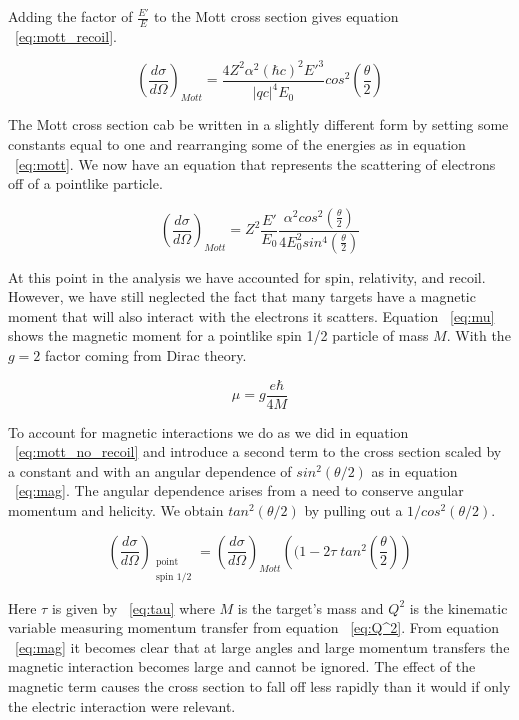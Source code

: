 \noindent Adding the factor of $\frac{E'}{E}$ to the Mott cross section gives equation ~\ref{eq:mott_recoil}.

\begin{equation} \label{eq:mott_recoil}
\left(\frac{d\sigma}{d\Omega}\right)_{Mott} = \frac{4Z^2\alpha^2\left(\hbar c\right)^2E'^3}{|qc|^4 E_0} cos^2 \left( \frac{\theta}{2} \right)
\end{equation}

\noindent The Mott cross section cab be written in a slightly different form by setting some constants equal to one and rearranging some of the energies as in equation ~\ref{eq:mott}. We now have an equation that represents the scattering of electrons off of a pointlike particle.

\begin{equation} \label{eq:mott}
\left(\frac{d\sigma}{d\Omega}\right)_{Mott} = Z^2 \frac{E'}{E_0} \frac{\alpha^2 cos^2\left( \frac{\theta}{2} \right)}{4E_0^2 sin^4\left( \frac{\theta}{2} \right)}
\end{equation}

At this point in the analysis we have accounted for spin, relativity, and recoil. However, we have still neglected the fact that many targets have a magnetic moment that will also interact with the electrons it scatters. Equation ~\ref{eq:mu} shows the magnetic moment for a pointlike spin 1/2 particle of mass $M$. With the $g=2$ factor coming from Dirac theory.  

\begin{equation} \label{eq:mu}
\mu = g \frac{e\hbar}{4M}
\end{equation}

To account for magnetic interactions we do as we did in equation ~\ref{eq:mott_no_recoil} and introduce a second term to the cross section scaled by a constant and with an angular dependence of $sin^2(\theta/2)$ as in equation ~\ref{eq:mag}. The angular dependence arises from a need to conserve angular momentum and helicity. We obtain $tan^2(\theta/2)$ by pulling out a $1/cos^2(\theta/2)$.

\begin{equation} \label{eq:mag}
\left(\frac{d\sigma}{d\Omega}\right)_{\substack{ \text{point} \\ \text{spin 1/2}}} = \left( \frac{d\sigma}{d\Omega} \right)_{Mott} \left( (1-2\tau \; tan^2\left( \frac{\theta}{2} \right) \right)
\end{equation}

\noindent Here $\tau$ is given by ~\ref{eq:tau} where $M$ is the target's mass and $Q^2$ is the kinematic variable measuring momentum transfer from equation ~\ref{eq:Q^2}. From equation ~\ref{eq:mag} it becomes clear that at large angles and large momentum transfers the magnetic interaction becomes large and cannot be ignored. The effect of the magnetic term causes the cross section to fall off less rapidly than it would if only the electric interaction were relevant.


